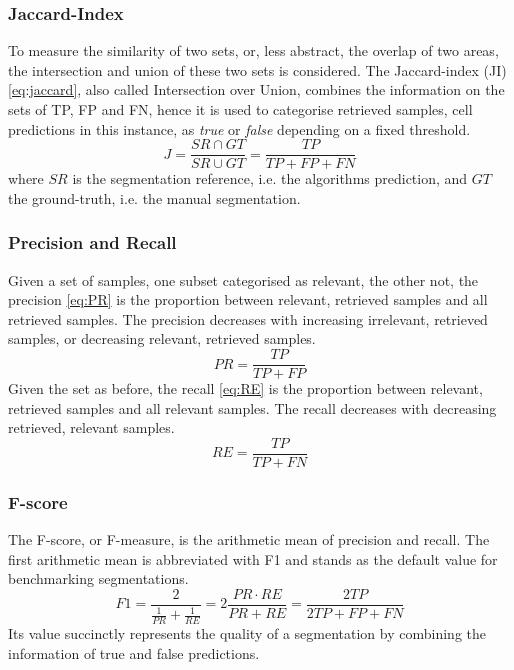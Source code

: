 \subsubsection*{Jaccard-Index}
To measure the similarity of two sets, or, less abstract, the overlap of two areas, the intersection and union of these two sets is considered. The Jaccard-index (JI) \eqref{eq:jaccard}, also called Intersection over Union, combines the information on the sets of TP, FP and FN, hence it is used to categorise retrieved samples, cell predictions in this instance, as \textit{true} or \textit{false} depending on a fixed threshold.
\begin{equation}
\label{eq:jaccard}
    J = \frac{SR\cap GT}{SR \cup GT} = \frac{TP}{TP+FP+FN} 
\end{equation}
where $SR$ is the segmentation reference, i.e. the algorithms prediction, and $GT$ the ground-truth, i.e. the manual segmentation.
\subsubsection*{Precision and Recall}
Given a set of samples, one subset categorised as relevant, the other not, the precision \eqref{eq:PR} is the proportion between relevant, retrieved samples and all retrieved samples. The precision decreases with increasing irrelevant, retrieved samples, or decreasing relevant, retrieved samples.
\begin{equation}
\label{eq:PR}
    PR = \frac{TP}{TP+FP}
\end{equation}
Given the set as before, the recall \eqref{eq:RE} is the proportion between relevant, retrieved samples and all relevant samples. The recall decreases with decreasing retrieved, relevant samples.
\begin{equation}
\label{eq:RE}
    RE = \frac{TP}{TP+FN}
\end{equation}
\subsubsection*{F-score}
The F-score, or F-measure, is the arithmetic mean of precision and recall. The first arithmetic mean is abbreviated with F1 and stands as the default value for benchmarking segmentations.
\begin{equation}
\label{eq:F1}
    F1 = \frac{2}{\frac{1}{PR}+\frac{1}{RE}} = 2\frac{PR\cdot RE}{PR+RE} = \frac{2TP}{2TP+FP+FN}
\end{equation}
Its value succinctly represents the quality of a segmentation by combining the information of true and false predictions.
